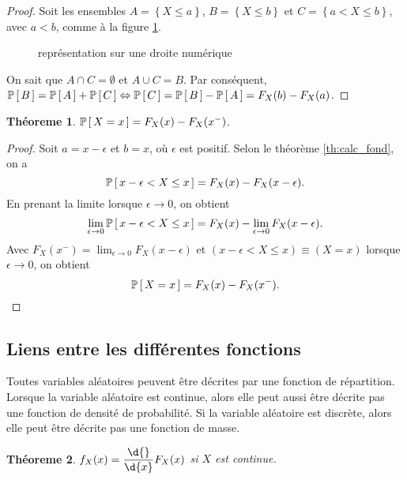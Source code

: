 \documentclass[11pt]{article}
\renewcommand\P[1]{%
	\ensuremath{%
		\mathbb{P}\left[\,#1\,\right]%
	}%
}%
\newtheorem{theoreme}{Théoreme}[section]
\theoremstyle{remark}
\theoremstyle{definition}
\begin{document}
\begin{proof}
	Soit les ensembles $A=\left\{X\leq a\right\}$, $B=\left\{X\leq b\right\}$
	et $C=\left\{a< X\leq b\right\}$, avec $a<b$, comme à la figure
	\ref{fig:droite_num}.
	\begin{figure}[H]
		\centering
		
		\caption{représentation sur une droite numérique}
		\label{fig:droite_num}
	\end{figure}
	
	On sait que $A\cap C=\emptyset$ et $A\cup C=B$. Par conséquent, 
	$\P{B}=\P{A}+\P{C}\Leftrightarrow\P{C}=\P{B}-\P{A}=F_X(b)-F_X(a)$.
\end{proof}

\begin{theoreme}
	$\P{X=x}=F_X(x)-F_X(x^-)$.
\end{theoreme}

\begin{proof}
	Soit $a=x-\epsilon$ et $b=x$, où $\epsilon$ est positif. Selon le théorème
	\ref{th:calc_fond}, on a
	\begin{equation*}
		\P{x-\epsilon<X\leq x}=F_X(x)-F_X(x-\epsilon).
	\end{equation*}
	En prenant la limite lorsque $\epsilon\rightarrow 0$, on obtient
	\begin{equation*}
		\lim_{\epsilon\rightarrow 0}\P{x-\epsilon<X\leq x}
		=F_X(x)-\lim_{\epsilon\rightarrow 0}F_X(x-\epsilon).
	\end{equation*}
	Avec $F_X(x^-)=\lim_{\epsilon\rightarrow 0}F_X(x-\epsilon)$ et
	$(x-\epsilon<X\leq x)\equiv (X=x)$ lorsque $\epsilon\rightarrow 0$, on
	obtient
	\begin{equation*}
		\P{X=x}=F_X(x)-F_X(x^-).\qedhere
	\end{equation*}
\end{proof}

\subsection{Liens entre les différentes fonctions}
Toutes variables aléatoires peuvent être décrites par une fonction de
répartition. Lorsque la variable aléatoire est continue, alors elle peut aussi
être décrite pas une fonction de densité de probabilité. Si la variable
aléatoire est discrète, alors elle peut être décrite pas une fonction de masse.

\begin{theoreme}
	$f_X(x)=\dfrac{\d{}}{\d{x}}F_X(x)$ si $X$ est continue.
\end{theoreme}
\end{document}
